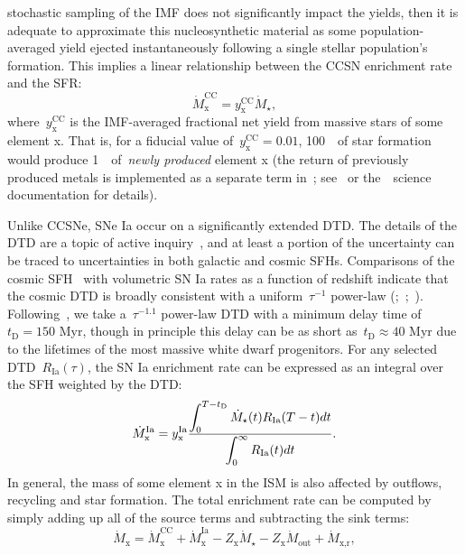 \documentclass[ms.tex]{subfiles}
\begin{document}
stochastic sampling of the IMF does not significantly impact the yields, then
it is adequate to approximate this nucleosynthetic material as some
population-averaged yield ejected instantaneously following a single stellar
population's formation.
This implies a linear relationship between the CCSN enrichment rate and the
SFR:
\begin{equation}
\dot{M}_\text{x}^\text{CC} = y_\text{x}^\text{CC} \dot{M}_\star,
\end{equation}
where~$y_\text{x}^\text{CC}$ is the IMF-averaged fractional net yield from
massive stars of some element x.
That is, for a fiducial value of~$y_\text{x}^\text{CC} = 0.01$, 100~\msun~of
star formation would produce 1~\msun~of~\textit{newly produced} element x (the
return of previously produced metals is implemented as a separate term
in~\vice; see~\citealt{Johnson2020} or the~\vice~science documentation for
details).
\par
Unlike CCSNe, SNe Ia occur on a significantly extended DTD.
The details of the DTD are a topic of active inquiry~\citep[e.g.,][]{Greggio2005,
Strolger2020, Freundlich2021}, and at least a portion of the uncertainty can be
traced to uncertainties in both galactic and cosmic SFHs.
Comparisons of the cosmic SFH~\citep[e.g.,][]{Hopkins2006, Madau2014, Davies2016,
Madau2017, Driver2018} with volumetric SN Ia rates as a function of redshift
indicate that the cosmic DTD is broadly consistent with a uniform~$\tau^{-1}$
power-law (\citealp{Maoz2012a};~\citealp*{Maoz2012b};~\citealp{Graur2013,
Graur2014}).
Following~\citet{Weinberg2017}, we take a~$\tau^{-1.1}$ power-law DTD with a
minimum delay time of~$t_\text{D} = 150$ Myr, though in principle this
delay can be as short as~$t_\text{D} \approx 40$ Myr due to the lifetimes
of the most massive white dwarf progenitors.
For any selected DTD~$R_\text{Ia}(\tau)$, the SN Ia enrichment rate can be
expressed as an integral over the SFH weighted by the DTD:
\begin{equation}
\dot{M}_\text{x}^\text{Ia} = y_\text{x}^\text{Ia}\frac{\displaystyle{
	\int_0^{T - t_\text{D}} \dot{M}_\star(t) R_\text{Ia}(T - t) dt
}}{\displaystyle{
	\int_0^\infty R_\text{Ia}(t) dt
}}.
\end{equation}
In general, the mass of some element x in the ISM is also affected by outflows,
recycling and star formation.
The total enrichment rate can be computed by simply adding up all of the source
terms and subtracting the sink terms:
\begin{equation}
\dot{M}_\text{x} = \dot{M}_\text{x}^\text{CC} + \dot{M}_\text{x}^\text{Ia} -
Z_\text{x}\dot{M}_\star - Z_\text{x}\dot{M}_\text{out} + \dot{M}_{\text{x,r}},
\label{eq:enrichment}
\end{equation}
\end{document}
